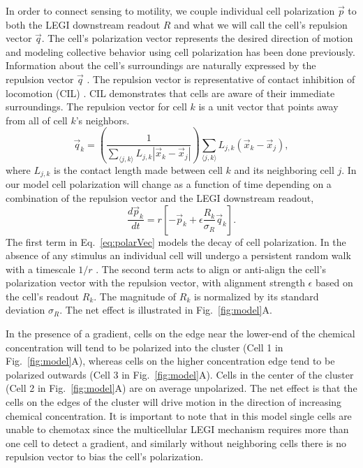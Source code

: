 In order to connect sensing to motility, we couple individual cell polarization $\vec{p}$ to both the LEGI downstream readout $R$ and what we will call the cell's repulsion vector $\vec{q}$. The cell's polarization vector represents the desired direction of motion \cite{jilkine2011comparison} and modeling collective behavior using cell polarization has been done previously\cite{szabo2010collective,camley2016emergent}. Information about the cell's surroundings are naturally expressed by the repulsion vector $\vec{q}$ \cite{camley2016emergent}. The repulsion vector is representative of contact inhibition of locomotion (CIL) \cite{mayor2010keeping}. CIL demonstrates that cells are aware of their immediate surroundings. The repulsion vector for cell $k$ is a unit vector that points away from all of cell $k$'s neighbors.
\begin{equation}
    \vec{q}_k = \left( \frac{1}{\sum_{\langle j,k \rangle} L_{j,k}|\vec{x}_k - \vec{x}_j|} \right)
    \sum_{\langle j,k \rangle} L_{j,k} \left( \vec{x}_k - \vec{x}_j \right),
\end{equation}
where $L_{j,k}$ is the contact length made between cell $k$ and its neighboring cell $j$. In our model cell polarization will change as a function of time depending on a combination of the repulsion vector and the LEGI downstream readout,
\begin{equation} \label{eq:polarVec}
    \frac{d\vec{p}_k}{dt} = r \left[ -\vec{p}_k + \epsilon \frac{R_k}{\sigma_R} \vec{q}_k \right].
\end{equation}
The first term in Eq.\ \ref{eq:polarVec} models the decay of cell polarization. In the absence of any stimulus an individual cell will undergo a persistent random walk with a timescale $1/r$ \cite{szabo2010collective}. The second term acts to align or anti-align the cell’s polarization vector with the repulsion vector, with alignment strength $\epsilon$ based on the cell's readout $R_k$. The magnitude of $R_k$ is normalized by its standard deviation $\sigma_R$. The net effect is illustrated in Fig.\ \ref{fig:model}A.

In the presence of a gradient, cells on the edge near the lower-end of the chemical concentration will tend to be polarized into the cluster (Cell 1 in Fig.\ \ref{fig:model}A), whereas cells on the higher concentration edge tend to be polarized outwards (Cell 3 in Fig.\ \ref{fig:model}A). Cells in the center of the cluster (Cell 2 in Fig.\ \ref{fig:model}A) are on average unpolarized. The net effect is that the cells on the edges of the cluster will drive motion in the direction of increasing chemical concentration. It is important to note that in this model single cells are unable to chemotax since the multicellular LEGI mechanism requires more than one cell to detect a gradient, and similarly without neighboring cells there is no repulsion vector to bias the cell's polarization.


